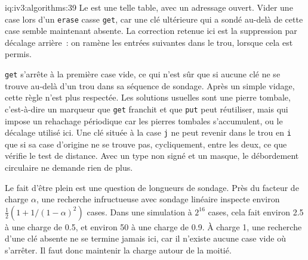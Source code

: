 \begin{solution}{iq:iv3:algorithms:39}
Le  est une telle table, avec un adressage ouvert. Vider une case lors d'un \texttt{erase} casse \texttt{get}, car une clé ultérieure qui a sondé au-delà de cette case semble maintenant absente. La correction retenue ici est la suppression par décalage arrière~: on ramène les entrées suivantes dans le trou, lorsque cela est permis.
\label{lst:iv3:al:flatmap}

\texttt{get} s'arrête à la première case vide, ce qui n'est sûr que si aucune clé ne se trouve au-delà d'un trou dans sa séquence de sondage. Après un simple vidage, cette règle n'est plus respectée. Les solutions usuelles sont une pierre tombale, c'est-à-dire un marqueur que \texttt{get} franchit et que \texttt{put} peut réutiliser, mais qui impose un rehachage périodique car les pierres tombales s'accumulent, ou le décalage utilisé ici. Une clé située à la case \texttt{j} ne peut revenir dans le trou en \texttt{i} que si sa case d'origine ne se trouve pas, cycliquement, entre les deux, ce que vérifie le test de distance. Avec un type non signé et un masque, le débordement circulaire ne demande rien de plus.

Le fait d'être plein est une question de longueurs de sondage. Près du facteur de charge $\alpha$, une recherche infructueuse avec sondage linéaire inspecte environ $\frac{1}{2}(1 + 1/(1 - \alpha)^2)$ cases. Dans une simulation à $2^{16}$ cases, cela fait environ 2.5 à une charge de 0.5, et environ 50 à une charge de 0.9. À charge 1, une recherche d'une clé absente ne se termine jamais ici, car il n'existe aucune case vide où s'arrêter. Il faut donc maintenir la charge autour de la moitié.

\end{solution}


